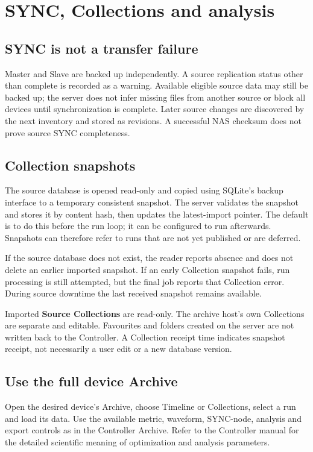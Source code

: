 \documentclass[11pt,oneside,openany]{book}
\newcommand{\code}[1]{\texttt{\detokenize{#1}}}
\newcommand{\ui}[1]{\textbf{#1}}
\begin{document}
\chapter{SYNC, Collections and analysis}
\section{SYNC is not a transfer failure}
Master and Slave are backed up independently. A source
\code{sync_manifest.json} replication status other than complete is recorded as
a warning. Available eligible source data may still be backed up; the server does
not infer missing files from another source or block all devices until synchronization
is complete. Later source changes are discovered by the next inventory and stored
as revisions. A successful NAS checksum does not prove source SYNC completeness.

\section{Collection snapshots}
The source database is opened read-only and copied using SQLite's backup interface
to a temporary consistent snapshot. The server validates the snapshot and stores it
by content hash, then updates the latest-import pointer. The default is to do this
before the run loop; it can be configured to run afterwards. Snapshots can therefore
refer to runs that are not yet published or are deferred.

If the source database does not exist, the reader reports absence and does not
delete an earlier imported snapshot. If an early Collection snapshot fails, run
processing is still attempted, but the final job reports that Collection error.
During source downtime the last received snapshot remains available.

Imported \ui{Source Collections} are read-only. The archive host's own Collections
are separate and editable. Favourites and folders created on the server are not
written back to the Controller. A Collection receipt time indicates snapshot
receipt, not necessarily a user edit or a new database version.

\section{Use the full device Archive}
Open the desired device's Archive, choose Timeline or Collections, select a run
and load its data. Use the available metric, waveform, SYNC-node, analysis and
export controls as in the Controller Archive. Refer to the Controller manual for
the detailed scientific meaning of optimization and analysis parameters.
\end{document}

